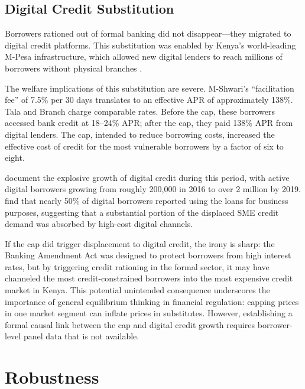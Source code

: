 \documentclass[12pt]{article}
\begin{document}
\subsection{Digital Credit Substitution}

Borrowers rationed out of formal banking did not disappear---they migrated to digital credit platforms. This substitution was enabled by Kenya's world-leading M-Pesa infrastructure, which allowed new digital lenders to reach millions of borrowers without physical branches \citep{jack2014risk, suri2017long}.

The welfare implications of this substitution are severe. M-Shwari's ``facilitation fee'' of 7.5\% per 30 days translates to an effective APR of approximately 138\%. Tala and Branch charge comparable rates. Before the cap, these borrowers accessed bank credit at 18--24\% APR; after the cap, they paid 138\% APR from digital lenders. The cap, intended to reduce borrowing costs, increased the effective cost of credit for the most vulnerable borrowers by a factor of six to eight.

\citet{bharadwaj2019fintech} document the explosive growth of digital credit during this period, with active digital borrowers growing from roughly 200,000 in 2016 to over 2 million by 2019. \citet{totolo2018digital} find that nearly 50\% of digital borrowers reported using the loans for business purposes, suggesting that a substantial portion of the displaced SME credit demand was absorbed by high-cost digital channels.

If the cap did trigger displacement to digital credit, the irony is sharp: the Banking Amendment Act was designed to protect borrowers from high interest rates, but by triggering credit rationing in the formal sector, it may have channeled the most credit-constrained borrowers into the most expensive credit market in Kenya. This potential unintended consequence underscores the importance of general equilibrium thinking in financial regulation: capping prices in one market segment can inflate prices in substitutes. However, establishing a formal causal link between the cap and digital credit growth requires borrower-level panel data that is not available.


\section{Robustness}
\label{sec:robustness}
\end{document}
